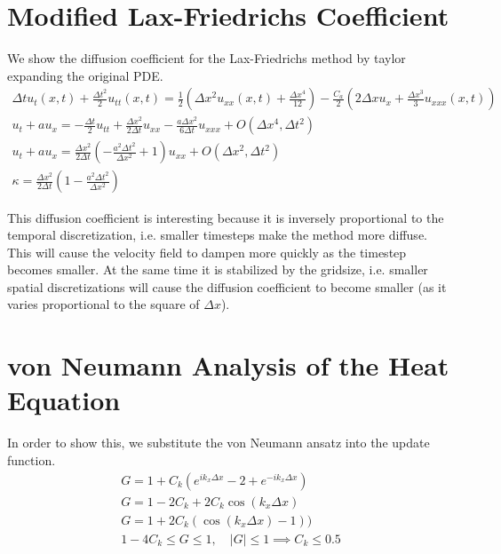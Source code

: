 \documentclass{article}
\begin{document}
\section{Modified Lax-Friedrichs Coefficient}

We show the diffusion coefficient for the Lax-Friedrichs method by taylor
expanding the original PDE. 
\begin{gather*}
    \Delta t u_t(x,t) + \frac{\Delta t^2}{2} u_{tt}(x,t)  =
    \frac{1}{2}\left(\Delta x^2u_{xx}(x,t) + \frac{\Delta x^4}{12} \right) -
    \frac{C_a}{2}\left(2\Delta x u_x + \frac{\Delta x^3}{3}u_{xxx}(x,t) \right)\\
    u_t + a u_x = - \frac{\Delta t}{2} u_{tt} + \frac{\Delta x^2}{2\Delta
    t}u_{xx} - \frac{a\Delta x^2}{6\Delta t}u_{xxx} + O(\Delta x^4, \Delta
    t^2)\\
    u_t + a u_x = \frac{\Delta x^2}{2\Delta t}\left(-\frac{a^2\Delta t^2}{\Delta
    x^2} + 1\right)u_{xx} + O(\Delta x^2, \Delta t^2)\\
    \kappa = \frac{\Delta x^2}{2\Delta t}\left(1-\frac{a^2\Delta t^2}{\Delta
    x^2}\right)
\end{gather*}

This diffusion coefficient is interesting because it is inversely proportional
to the temporal discretization, i.e. smaller timesteps make the method more
diffuse. This will cause the velocity field to dampen more quickly as the
timestep becomes smaller. At the same time it is stabilized by the gridsize,
i.e. smaller spatial discretizations will cause the diffusion coefficient to
become smaller (as it varies proportional to the square of $\Delta x$). 

\section{von Neumann Analysis of the Heat Equation}

In order to show this, we substitute the von Neumann ansatz into the update
function.  
\begin{gather*}
    G = 1 + C_k\left(e^{ik_x\Delta x} - 2 + e^{-ik_x\Delta x}\right)\\
    G = 1 - 2C_k + 2C_k\cos(k_x\Delta x) \\
    G = 1 + 2C_k(\cos(k_x\Delta x) -1))\\
    1 - 4C_k \le G \le 1,\quad |G| \le 1  \implies C_k \le 0.5
\end{gather*}
\end{document}
